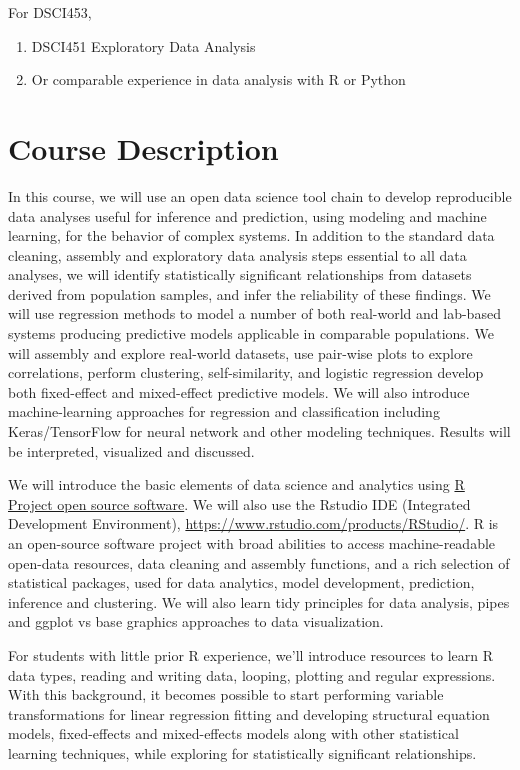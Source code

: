 \documentclass[10pt]{article} %
\begin{document}
    For DSCI453,
    \begin{enumerate}
      \item DSCI451 Exploratory Data Analysis
      \item Or comparable experience in data analysis with R or Python
    \end{enumerate}

\section{Course Description}

  In this course, we will use an open data science tool chain to develop reproducible data analyses useful for inference and prediction, using modeling and machine learning, for the behavior of complex systems.
  In addition to the standard data cleaning, assembly and exploratory data analysis steps essential to all data analyses, we will identify statistically significant relationships from datasets derived from population samples, and infer the reliability of these findings.
  We will use regression methods to model a number of both real-world and lab-based systems producing predictive models applicable in comparable populations.
  We will assembly and explore real-world datasets, use pair-wise plots to explore correlations, perform clustering, self-similarity, and logistic regression develop both fixed-effect and mixed-effect predictive models.
  We will also introduce machine-learning approaches for regression and classification including Keras/TensorFlow for neural network and other modeling techniques.
  Results will be interpreted, visualized and discussed.

  We will introduce the basic elements of data science and analytics using \href{"http://cran.case.edu/"}{R Project open source software}.
  We will also use the Rstudio IDE (Integrated Development Environment), \url{https://www.rstudio.com/products/RStudio/}.
  R is an open-source software project with broad abilities to access machine-readable open-data resources, data cleaning and assembly functions, and a rich selection of statistical packages, used for data analytics, model development, prediction, inference and clustering.
  We will also learn tidy principles for data analysis, pipes and ggplot vs base graphics approaches to data visualization.

  For students with little prior R experience, we'll introduce resources to learn R data types, reading and writing data, looping, plotting and regular expressions.
  With this background, it becomes possible to start performing variable transformations for linear regression fitting and developing structural equation models, fixed-effects and mixed-effects models along with other statistical learning techniques, while exploring for statistically significant relationships.
\end{document}

